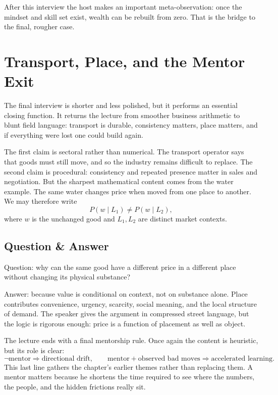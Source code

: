 After this interview the host makes an important meta-observation: once the mindset and skill set exist, wealth can be rebuilt from zero. That is the bridge to the final, rougher case.

\section{Transport, Place, and the Mentor Exit}

The final interview is shorter and less polished, but it performs an essential closing function. It returns the lecture from smoother business arithmetic to blunt field language: transport is durable, consistency matters, place matters, and if everything were lost one could build again.

The first claim is sectoral rather than numerical. The transport operator says that goods must still move, and so the industry remains difficult to replace. The second claim is procedural: consistency and repeated presence matter in sales and negotiation. But the sharpest mathematical content comes from the water example. The same water changes price when moved from one place to another. We may therefore write
\begin{equation}
P(w\mid L_1) \ne P(w\mid L_2),
\end{equation}
where \(w\) is the unchanged good and \(L_1,L_2\) are distinct market contexts.

\subsection{Question \& Answer}

Question: why can the same good have a different price in a different place without changing its physical substance?

Answer: because value is conditional on context, not on substance alone. Place contributes convenience, urgency, scarcity, social meaning, and the local structure of demand. The speaker gives the argument in compressed street language, but the logic is rigorous enough: price is a function of placement as well as object.

The lecture ends with a final mentorship rule. Once again the content is heuristic, but its role is clear:
\begin{equation}
\neg \text{mentor} \Rightarrow \text{directional drift}, \qquad
\text{mentor} + \text{observed bad moves} \Rightarrow \text{accelerated learning}.
\end{equation}
This last line gathers the chapter's earlier themes rather than replacing them. A mentor matters because he shortens the time required to see where the numbers, the people, and the hidden frictions really sit.

